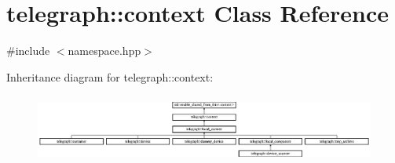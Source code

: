\hypertarget{classtelegraph_1_1context}{}\section{telegraph\+:\+:context Class Reference}
\label{classtelegraph_1_1context}


{\ttfamily \#include $<$namespace.\+hpp$>$}

Inheritance diagram for telegraph\+:\+:context\+:\begin{figure}[H]
\begin{center}
\leavevmode
\includegraphics[height=2.258065cm]{classtelegraph_1_1context}
\end{center}
\end{figure}

